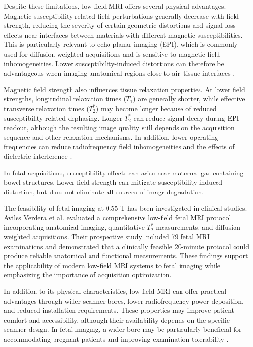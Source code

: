 Despite these limitations, low-field MRI offers several physical advantages. Magnetic susceptibility-related field perturbations generally decrease with field strength, reducing the severity of certain geometric distortions and signal-loss effects near interfaces between materials with different magnetic susceptibilities. This is particularly relevant to echo-planar imaging (EPI), which is commonly used for diffusion-weighted acquisitions and is sensitive to magnetic field inhomogeneities. Lower susceptibility-induced distortions can therefore be advantageous when imaging anatomical regions close to air--tissue interfaces \autocite{lowfieldbody2023,avilesverdera2023lowfield}.

Magnetic field strength also influences tissue relaxation properties. At lower field strengths, longitudinal relaxation times ($T_1$) are generally shorter, while effective transverse relaxation times ($T_2^*$) may become longer because of reduced susceptibility-related dephasing. Longer $T_2^*$ can reduce signal decay during EPI readout, although the resulting image quality still depends on the acquisition sequence and other relaxation mechanisms. In addition, lower operating frequencies can reduce radiofrequency field inhomogeneities and the effects of dielectric interference \autocite{lowfieldbody2023}.

In fetal acquisitions, susceptibility effects can arise near maternal gas-containing bowel structures. Lower field strength can mitigate susceptibility-induced distortion, but does not eliminate all sources of image degradation.

The feasibility of fetal imaging at 0.55 T has been investigated in clinical studies. Aviles Verdera et al. \autocite{avilesverdera2023lowfield} evaluated a comprehensive low-field fetal MRI protocol incorporating anatomical imaging, quantitative $T_2^*$ measurements, and diffusion-weighted acquisitions. Their prospective study included 79 fetal MRI examinations and demonstrated that a clinically feasible 20-minute protocol could produce reliable anatomical and functional measurements. These findings support the applicability of modern low-field MRI systems to fetal imaging while emphasizing the importance of acquisition optimization.

In addition to its physical characteristics, low-field MRI can offer practical advantages through wider scanner bores, lower radiofrequency power deposition, and reduced installation requirements. These properties may improve patient comfort and accessibility, although their availability depends on the specific scanner design. In fetal imaging, a wider bore may be particularly beneficial for accommodating pregnant patients and improving examination tolerability \autocite{avilesverdera2023lowfield,lowfieldbody2023}.

